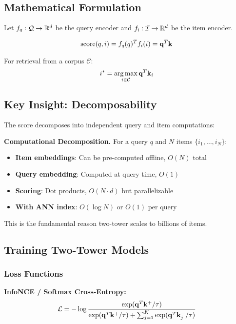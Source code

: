 \subsection{Mathematical Formulation}

Let $f_q: \mathcal{Q} \to \mathbb{R}^d$ be the query encoder and $f_i: \mathcal{I} \to \mathbb{R}^d$ be the item encoder.

\begin{equation}
\text{score}(q, i) = f_q(q)^T f_i(i) = \mathbf{q}^T \mathbf{k}
\end{equation}

For retrieval from a corpus $\mathcal{C}$:
\begin{equation}
i^* = \operatorname*{arg\,max}_{i \in \mathcal{C}} \mathbf{q}^T \mathbf{k}_i
\end{equation}

\subsection{Key Insight: Decomposability}

The score decomposes into independent query and item computations:

\textbf{Computational Decomposition.} For a query $q$ and $N$ items $\{i_1, \ldots, i_N\}$:
\begin{itemize}
    \item \textbf{Item embeddings}: Can be pre-computed offline, $O(N)$ total
    \item \textbf{Query embedding}: Computed at query time, $O(1)$
    \item \textbf{Scoring}: Dot products, $O(N \cdot d)$ but parallelizable
    \item \textbf{With ANN index}: $O(\log N)$ or $O(1)$ per query
\end{itemize}

This is the fundamental reason two-tower scales to billions of items.

\subsection{Training Two-Tower Models}

\subsubsection{Loss Functions}

\textbf{InfoNCE / Softmax Cross-Entropy:}
\begin{equation}
\mathcal{L} = -\log \frac{\exp(\mathbf{q}^T \mathbf{k}^+ / \tau)}{\exp(\mathbf{q}^T \mathbf{k}^+ / \tau) + \sum_{j=1}^{K} \exp(\mathbf{q}^T \mathbf{k}_j^- / \tau)}
\end{equation}

